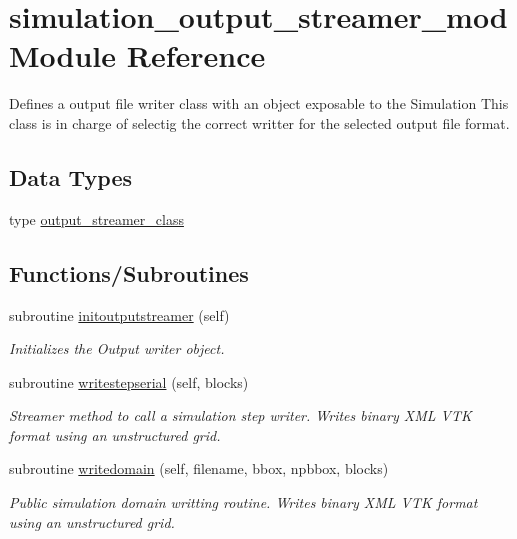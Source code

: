 \hypertarget{namespacesimulation__output__streamer__mod}{}\section{simulation\+\_\+output\+\_\+streamer\+\_\+mod Module Reference}
\label{namespacesimulation__output__streamer__mod}


Defines a output file writer class with an object exposable to the Simulation This class is in charge of selectig the correct writter for the selected output file format.  


\subsection*{Data Types}
\begin{DoxyCompactItemize}
\item 
type \mbox{\hyperlink{structsimulation__output__streamer__mod_1_1output__streamer__class}{output\+\_\+streamer\+\_\+class}}
\end{DoxyCompactItemize}
\subsection*{Functions/\+Subroutines}
\begin{DoxyCompactItemize}
\item 
subroutine \mbox{\hyperlink{namespacesimulation__output__streamer__mod_a82c657d25adca9e0353ec9f87a4dd0c9}{initoutputstreamer}} (self)
\begin{DoxyCompactList}\small\item\em Initializes the Output writer object. \end{DoxyCompactList}\item 
subroutine \mbox{\hyperlink{namespacesimulation__output__streamer__mod_a4a290f3ef9ac868e173eab1ab9fd54b8}{writestepserial}} (self, blocks)
\begin{DoxyCompactList}\small\item\em Streamer method to call a simulation step writer. Writes binary X\+ML V\+TK format using an unstructured grid. \end{DoxyCompactList}\item 
subroutine \mbox{\hyperlink{namespacesimulation__output__streamer__mod_a1df8126a96e9b81ddf62841587728663}{writedomain}} (self, filename, bbox, npbbox, blocks)
\begin{DoxyCompactList}\small\item\em Public simulation domain writting routine. Writes binary X\+ML V\+TK format using an unstructured grid. \end{DoxyCompactList}\end{DoxyCompactItemize}
